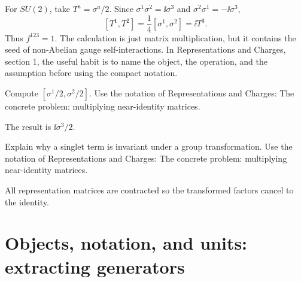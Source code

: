 \begin{example}
For \(SU(2)\), take \(T^a=\sigma^a/2\).  Since \(\sigma^1\sigma^2=\ii\sigma^3\) and \(\sigma^2\sigma^1=-\ii\sigma^3\),
\[
  [T^1,T^2]=\frac14[\sigma^1,\sigma^2]=\ii T^3.
\]
Thus \(f^{123}=1\).  The calculation is just matrix multiplication, but it contains the seed of non-Abelian gauge self-interactions.  In Representations and Charges, section 1, the useful habit is to name the object, the operation, and the assumption before using the compact notation.
\end{example}



\begin{exercise}
Compute \([\sigma^1/2,\sigma^2/2]\).  Use the notation of Representations and Charges: The concrete problem: multiplying near-identity matrices.
\begin{answer}
The result is \(\ii\sigma^3/2\).
\end{answer}
\end{exercise}

\begin{exercise}
Explain why a singlet term is invariant under a group transformation.  Use the notation of Representations and Charges: The concrete problem: multiplying near-identity matrices.
\begin{answer}
All representation matrices are contracted so the transformed factors cancel to the identity.
\end{answer}
\end{exercise}



\section{Objects, notation, and units: extracting generators}













